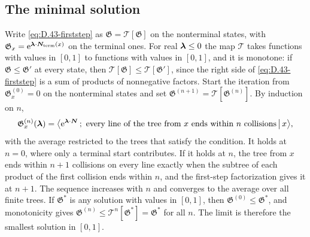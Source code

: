 \subsection{The minimal solution}

Write \cref{eq:D.43-firststep} as $\mathfrak{G} = \mathcal{T}[\mathfrak{G}]$ on the nonterminal states, with $\mathfrak{G}_x = \mathrm{e}^{\bm{\lambda}\cdot\bm{N}_{\mathrm{term}}(x)}$ on the terminal ones. For real $\bm{\lambda} \le 0$ the map $\mathcal{T}$ takes functions with values in $[0, 1]$ to functions with values in $[0, 1]$, and it is monotone: if $\mathfrak{G} \le \mathfrak{G}'$ at every state, then $\mathcal{T}[\mathfrak{G}] \le \mathcal{T}[\mathfrak{G}']$, since the right side of \cref{eq:D.43-firststep} is a sum of products of nonnegative factors. Start the iteration from $\mathfrak{G}^{(0)}_x = 0$ on the nonterminal states and set $\mathfrak{G}^{(n+1)} = \mathcal{T}[\mathfrak{G}^{(n)}]$. By induction on $n$,
\begin{equation*}
  \mathfrak{G}^{(n)}_x(\bm{\lambda}) = \bigl\langle\mathrm{e}^{\bm{\lambda}\cdot\bm{N}}\,;\ \text{every line of the tree from } x \text{ ends within } n \text{ collisions}\,\big|\,x\bigr\rangle ,
\end{equation*}
with the average restricted to the trees that satisfy the condition. It holds at $n = 0$, where only a terminal start contributes. If it holds at $n$, the tree from $x$ ends within $n + 1$ collisions on every line exactly when the subtree of each product of the first collision ends within $n$, and the first-step factorization gives it at $n + 1$. The sequence increases with $n$ and converges to the average over all finite trees. If $\mathfrak{G}^*$ is any solution with values in $[0, 1]$, then $\mathfrak{G}^{(0)} \le \mathfrak{G}^*$, and monotonicity gives $\mathfrak{G}^{(n)} \le \mathcal{T}^n[\mathfrak{G}^*] = \mathfrak{G}^*$ for all $n$. The limit is therefore the smallest solution in $[0, 1]$.

